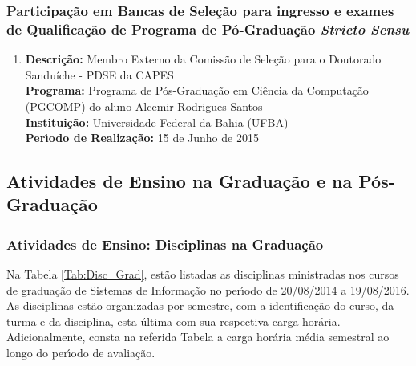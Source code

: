 \documentclass[a4paper,oneside,10pt]{article}
\begin{document}

\subsubsection{Participa\c{c}\~{a}o em Bancas de Sele\c{c}\~{a}o para ingresso e exames de Qualifica\c{c}\~ao de Programa de P\'{o}-Gradua\c{c}\~{a}o \textit{Stricto Sensu}}

\begin{enumerate}
\renewcommand{\labelenumi}{{\large\bfseries\arabic{enumi}.}}
\vspace{0.3cm}

\item       \textbf{Descrição:} Membro Externo da Comissão de Seleção para o Doutorado Sanduíche - PDSE da CAPES \mbox{} \\
            \textbf{Programa:} Programa de Pós-Graduação em Ciência da Computação (PGCOMP) do aluno Alcemir Rodrigues Santos\\
            \textbf{Instituição:} Universidade Federal da Bahia (UFBA) \\
            \textbf{Per\'{\i}odo de Realiza\c{c}\~{a}o:} 15 de Junho de 2015

\end{enumerate}


\subsection{Atividades de Ensino na Graduação e na Pós-Graduação}
\vspace{0.3cm}

\subsubsection{Atividades de Ensino: Disciplinas na Gradua\c{c}\~{a}o}
\vspace{0.3cm}

Na Tabela \ref{Tab:Disc_Grad}, est\~{a}o listadas as disciplinas ministradas nos cursos de gradua\c{c}\~{a}o de Sistemas de Informa\c{c}\~{a}o no per\'{\i}odo de 20/08/2014 a 19/08/2016. As disciplinas est\~{a}o organizadas por semestre, com a identifica\c{c}\~{a}o do curso, da turma e da disciplina, esta \'{u}ltima com sua respectiva carga hor\'{a}ria. Adicionalmente, consta na referida Tabela a carga hor\'{a}ria m\'{e}dia semestral ao longo do per\'{\i}odo de avalia\c{c}\~{a}o.
\end{document}
